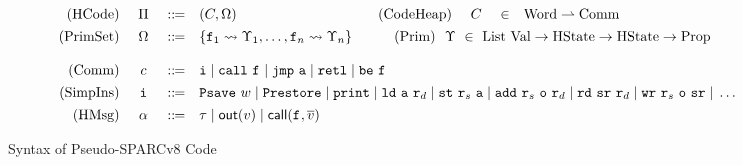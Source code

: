 \begin{figure*}[!t]
    \centering
    \vspace{-2em}
    \[
        \begin{array}{rcclcrccl}
            \TYPE{(HCode)} & \ \HMd \ & \define & (\code, \hprimset) & & 
            \qquad\,
            \TYPE{(CodeHeap)} & \ \code \ & \in & \TYPE{Word} \rightharpoonup \TYPE{Comm} 
            \\
            \\[-8pt]
            \TYPE{(PrimSet)} & \hprimset & \define & 
            \multicolumn{6}{l}
                {
                    \{ \lab{1} \rightsquigarrow \hprim_1, \dots, \lab{n} \rightsquigarrow \hprim_n \}
                    \qquad\quad
                    \TYPE{(Prim)} \ \ \hprim \ \in \ 
                    \TYPE{List} \ \TYPE{Val} \rightarrow \TYPE{HState} \rightarrow 
                    \TYPE{HState} \rightarrow \TYPE{Prop}            
                }  \\
            \\
            \TYPE{(Comm)} & \comm & \define & 
            \multicolumn{6}{l}
            {
                \simplins{} \sepline \call{} \ \lab{} 
                \sepline \jmp{} \ \aexp \sepline \retl \sepline \be{} \ \lab{}
            }  
            \\
            \\[-8pt]
            \TYPE{(SimpIns)} & \simplins{} & \define & 
            \multicolumn{6}{l}
            {
                \Psave \ \word \sepline \Prestore  \sepline \cprint \sepline 
                \ld{} \ \aexp \ \reg{d} \sepline 
                \st{} \ \reg{s} \ \aexp \sepline \cadd{} \ \reg{s} \ \oexp \ \reg{d}
                \sepline
                \rd \ \sr \ \reg{d} \sepline \cwr \ \reg{s} \ \oexp \ \sr 
                \sepline \dots
            } 
            \\
            \\[-8pt]
            \TYPE{(HMsg)} & \hmsg & \define & \empmsg \sepline \outEvt{\val} \sepline 
            \callEvt{\lab{}, \args{\val}} 
        \end{array}
    \]
    \vspace{-1em}
    \caption{Syntax of Pseudo-SPARCv8 Code}
    \label{fig:syntax-of-concur-pseudo-sparc}
    \vspace{-1em}
\end{figure*}
